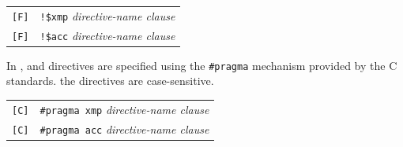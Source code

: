 \vspace{0.5cm}
\begin{tabular}{ll}
\verb![F]! & \verb|!$xmp| {\it directive-name clause} \\
\verb![F]! & \verb|!$acc| {\it directive-name clause} \\
\end{tabular}
\vspace{0.5cm}

In {\XACC}, 
{\XMP} and {\OACC} directives are specified using the \verb|#pragma| mechanism provided by the C standards.
the directives are case-sensitive.

\vspace{0.5cm}
\begin{tabular}{ll}
\verb![C]! & \verb|#pragma xmp| {\it directive-name clause} \\
\verb![C]! & \verb|#pragma acc| {\it directive-name clause} \\
\end{tabular}
\vspace{0.5cm}

